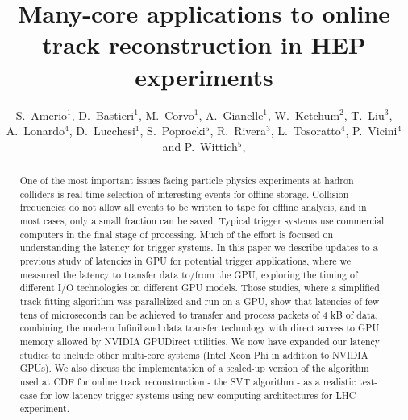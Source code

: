\documentclass[letterpaper]{jpconf}
\begin{document}
\title{Many-core applications to online track reconstruction in HEP experiments}
\author{S.~Amerio$^1$, 
  D.~Bastieri$^1$, 
  M.~Corvo$^1$, 
  A.~Gianelle$^1$, 
  W.~Ketchum$^2$,
  T.~Liu$^3$, 
  A.~Lonardo$^4$, 
  D.~Lucchesi$^1$,
  S.~Poprocki$^5$, 
  R.~Rivera$^3$, 
  L.~Tosoratto$^4$,
  P.~Vicini$^4$
  and 
  P.~Wittich$^5$,
}
\address{$^1$ INFN and University of Padova, Italy}
\address{$^2$ Los Alamos National Laboratory, New Mexico, USA}
\address{$^3$ Fermi National Accelerator Laboratory, Illinois, USA}
\address{$^4$ INFN Roma, Italy}
\address{$^5$ Cornell University, New York, USA}


\begin{abstract}
  One of the most important issues facing particle physics experiments
  at hadron colliders is real-time selection of interesting events for
  offline storage.  Collision frequencies do not allow all events to
  be written to tape for offline analysis, and in most cases, only a
  small fraction can be saved.  Typical trigger systems use commercial
  computers in the final stage of processing. Much of the effort is
  focused on understanding the latency for trigger systems. In this
  paper we describe updates to a previous study of latencies in GPU
  for potential trigger applications, where we measured the latency to
  transfer data to/from the GPU, exploring the timing of different I/O
  technologies on different GPU models.  Those studies, where a
  simplified track fitting algorithm was parallelized and run on a
  GPU, show that latencies of few tens of microseconds can be achieved
  to transfer and process packets of 4 kB of data, combining the
  modern Infiniband data transfer technology with direct access to GPU
  memory allowed by NVIDIA GPUDirect utilities.  We now have expanded
  our latency studies to include other multi-core systems (Intel Xeon
  Phi in addition to NVIDIA GPUs). We also discuss the implementation
  of a scaled-up version of the algorithm used at CDF for online track
  reconstruction - the SVT algorithm - as a realistic test-case for
  low-latency trigger systems using new computing architectures for
  LHC experiment.

\end{abstract}
\end{document}
